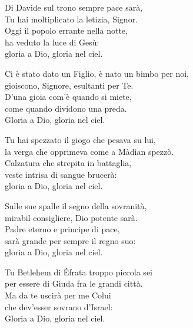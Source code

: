 

\spazio

\strofa Di Davide sul trono sempre pace sarà,\\
Tu hai moltiplicato la letizia, Signor.\\
Oggi il popolo errante nella notte,\\
ha veduto la luce di Gesù:\\
gloria a Dio, gloria nel ciel.

\spazio


\spazio

\strofa Ci è stato dato un Figlio, è nato un bimbo per noi,\\
gioiscono, Signore, esultanti per Te.\\
D'una gioia com'è quando si miete,\\
come quando dividono una preda.\\
Gloria a Dio, gloria nel ciel.

\spazio


\spazio

\strofa Tu hai spezzato il giogo che pesava su lui,\\
la verga che opprimeva come a Màdian spezzò.\\
Calzatura che strepita in battaglia,\\
veste intrisa di sangue brucerà:\\
gloria a Dio, gloria nel ciel.

\spazio


\spazio

\strofa Sulle sue spalle il segno della sovranità,\\
mirabil consigliere, Dio potente sarà.\\
Padre eterno e principe di pace,\\
sarà grande per sempre il regno suo:\\
gloria a Dio, gloria nel ciel.

\spazio


\spazio

\strofa Tu Betlehem di Éfrata troppo piccola sei\\
per essere di Giuda fra le grandi città.\\
Ma da te uscirà per me Colui\\
che dev'esser sovrano d'Israel:\\
Gloria a Dio, gloria nel ciel.

\spazio

